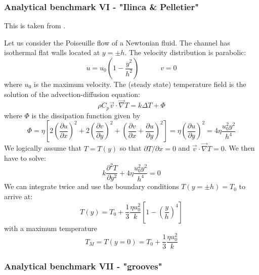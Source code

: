 \bscthesis {}

\subsubsection{Analytical benchmark VI \label{mms6} - "Ilinca \& Pelletier"}
 

This is taken from \cite{ilpe07}.

Let us consider the Poiseuille flow of a Newtonian fluid. The channel has 
isothermal flat walls located at $y=\pm h$. The velocity distribution is parabolic:
\[
u = u_0 \left(1-\frac{y^2}{h^2} \right) 
\quad\quad\quad
v=0
\]
where $u_0$ is the maximum velocity. The (steady state) temperature field is the solution of
the advection-diffusion equation:
\[
\rho C_p \vec v \cdot \vec\nabla T
= k \Delta T + \Phi
\]
where $\Phi$ is the dissipation function given by
\[
\Phi
=\eta \left[  
2\left(\frac{\partial u}{\partial x} \right)^2 + 
2\left(\frac{\partial v}{\partial y} \right)^2 +
\left( \frac{\partial v}{\partial x} + \frac{\partial u}{\partial y} \right)^2
\right]
=
\eta \left( \frac{\partial u}{\partial y} \right)^2 = 4 \eta \frac{u_0^2 y^2}{h^4}
\]
We logically assume that $T=T(y)$ so that $\partial T/\partial x=0$ and $\vec v \cdot \vec\nabla T=0$.
We then have to solve:
\[
k \frac{\partial^2 T}{\partial y^2} + 4 \eta \frac{u_0^2 y^2}{h^4} = 0
\]
We can integrate twice and use the boundary conditions $T(y=\pm h)=T_0$ to arrive at:
\[
T(y) = T_0 + \frac{1}{3} \frac{\eta u_0^2}{k} \left[ 1-\left(\frac{y}{h}\right)^4  \right]
\]
with a maximum temperature
\[
T_M = T(y=0) = T_0 + \frac{1}{3} \frac{\eta u_0^2}{k} 
\]

\subsubsection{Analytical benchmark VII \label{mms7} - "grooves"}

